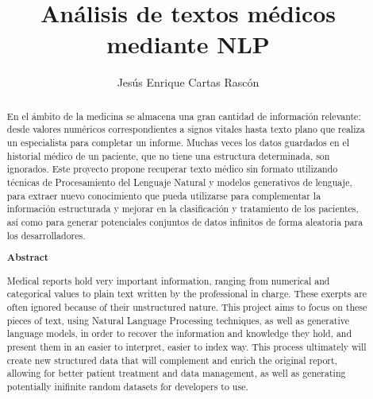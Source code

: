 \documentclass[12pt, a4paper, twoside]{report}
\title{Análisis de textos médicos \\mediante NLP}
\author{Jesús Enrique Cartas Rascón}
\begin{document}


\begin{abstract}
  En el ámbito de la medicina se almacena una gran cantidad de información relevante: desde valores numéricos correspondientes a signos vitales hasta texto plano que realiza un especialista para completar un informe. Muchas veces los datos guardados en el historial médico de un paciente, que no tiene una estructura determinada, son ignorados. Este proyecto propone recuperar texto médico sin formato utilizando técnicas de Procesamiento del Lenguaje Natural y modelos generativos de lenguaje, para extraer nuevo conocimiento que pueda utilizarse para complementar la información estructurada y mejorar en la clasificación y tratamiento de los pacientes, así como para generar potenciales conjuntos de datos infinitos de forma aleatoria para los desarrolladores.

\begin{center}
  \textbf{Abstract}
\end{center}


  Medical reports hold very important information, ranging from numerical and categorical values to plain text written by the professional in charge. These exerpts are often ignored because of their unstructured nature. This project aims to focus on these pieces of text, using Natural Language Processing techniques, as well as generative language models, in order to recover the information and knowledge they hold, and present them in an easier to interpret, easier to index way. This process ultimately will create new structured data that will complement and enrich the original report, allowing for better patient treatment and data management, as well as generating potentially inifinite random datasets for developers to use.

\end{abstract}


\tableofcontents
\listoffigures























\end{document}

